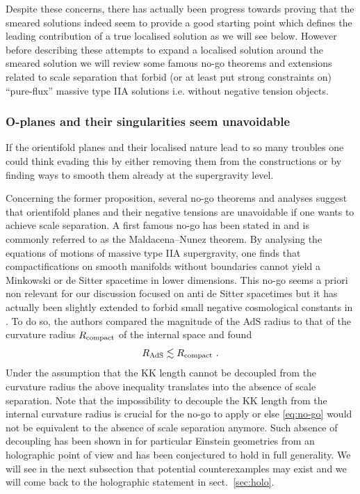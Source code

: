 \documentclass[11pt, a4paper]{article}
\newcommand{\Rads}{R_{\rm AdS}}
\begin{document}
Despite these concerns, there has actually been progress towards proving that the smeared solutions indeed seem to provide a good starting point which defines the leading contribution of a true localised solution as we will see below. However before describing these attempts to expand a localised solution around the smeared solution we will review some famous no-go theorems and extensions related to scale separation that forbid (or at least put strong constraints on) ``pure-flux'' massive type IIA solutions i.e. without negative tension objects.  

\subsubsection{O-planes and their singularities seem unavoidable}
\label{sec:unavoidable}

If the orientifold planes and their localised nature lead to so many troubles one could think evading this by either removing them from the constructions or by finding ways to smooth them already at the supergravity level.

Concerning the former proposition, several no-go theorems and analyses suggest that orientifold planes and their negative tensions are unavoidable if one wants to achieve scale separation. A first famous no-go has been stated in \cite{Maldacena:2000mw} and is commonly referred to as the Maldacena--Nunez theorem. By analysing the equations of motions of massive type IIA supergravity, one finds that compactifications on smooth manifolds without boundaries cannot yield a Minkowski or de Sitter spacetime in lower dimensions. This no-go seems a priori non relevant for our discussion focused on anti de Sitter spacetimes but it has actually been slightly extended to forbid small negative cosmological constants in \cite{Gautason:2015tig}. To do so, the authors compared the magnitude of the AdS radius to that of the curvature radius $R_{\rm compact}$ of the internal space and found
\begin{equation}
\label{eq:no-go}
\Rads\lesssim R_{\rm compact}\ .
\end{equation}
%
Under the assumption that the KK length cannot be decoupled from the curvature radius the above inequality translates into the absence of scale separation. Note that the impossibility to decouple the KK length from the internal curvature radius is crucial for the no-go to apply or else \eqref{eq:no-go} would not be equivalent to the absence of scale separation anymore. Such absence of decoupling has been shown in \cite{Collins:2022nux} for particular Einstein geometries from an holographic point of view and has been conjectured to hold in full generality. We will see in the next subsection that potential counterexamples may exist and we will come back to the holographic statement in sect.~\ref{sec:holo}.
\end{document}
